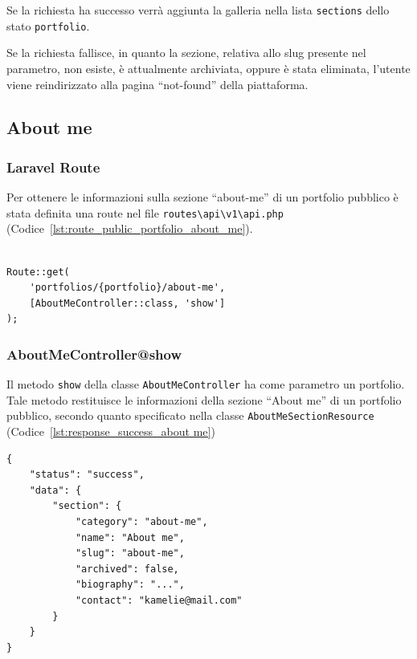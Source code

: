 Se la richiesta ha successo verr\`a aggiunta la galleria nella lista \verb|sections| dello stato \verb|portfolio|.

Se la richiesta fallisce, in quanto la sezione, relativa allo slug presente nel parametro, non esiste, \`e attualmente archiviata, oppure \`e stata eliminata, l'utente viene reindirizzato alla pagina ``not-found'' della piattaforma.
\subsection{About me}
\subsubsection{Laravel Route}
Per ottenere le informazioni sulla sezione ``about-me'' di un portfolio pubblico \`e stata definita una route nel file \verb|routes\api\v1\api.php| (Codice~\ref{lst:route_public_portfolio_about_me}).\\ \\
\begin{lstlisting}[caption={Route per ottenere la sezione ``about-me'' di un portfolio pubblico}, label={lst:route_public_portfolio_about_me}]
Route::get(
	'portfolios/{portfolio}/about-me',
	[AboutMeController::class, 'show']
);
\end{lstlisting}

\subsubsection{AboutMeController@show}
Il metodo \verb|show| della classe \verb|AboutMeController| ha come parametro un portfolio. Tale metodo restituisce le informazioni della sezione ``About me'' di un portfolio pubblico, secondo quanto specificato nella classe \verb|AboutMeSectionResource| (Codice~\ref{lst:response_success_about me}) \\
\begin{lstlisting}[caption={Risposta di successo about me}, label={lst:response_success_about me}]
{
	"status": "success",
	"data": {
		"section": {
			"category": "about-me",
			"name": "About me",
			"slug": "about-me",
			"archived": false,
			"biography": "...",
			"contact": "kamelie@mail.com"
		}
	}
}
\end{lstlisting}

